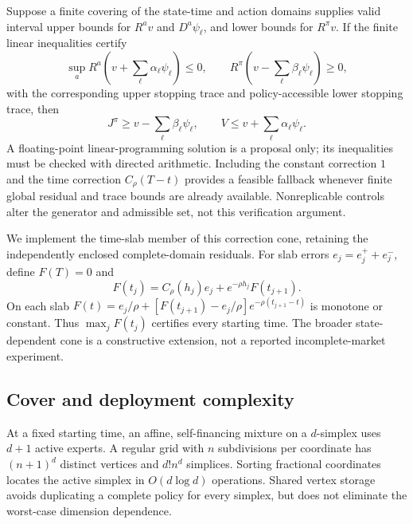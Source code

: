 \begin{proposition}\label{prop:r22cone}
Suppose a finite covering of the state-time and action domains supplies valid interval upper bounds for $R^av$ and $D^a\psi_\ell$, and lower bounds for $R^\pi v$. If the finite linear inequalities certify
\[
 \sup_a R^a\left(v+\sum_\ell\alpha_\ell\psi_\ell\right)\leq0,
 \qquad R^\pi\left(v-\sum_\ell\beta_\ell\psi_\ell\right)\geq0,
\]
with the corresponding upper stopping trace and policy-accessible lower stopping trace, then
\[
 J^\pi\geq v-\sum_\ell\beta_\ell\psi_\ell,
 \qquad V\leq v+\sum_\ell\alpha_\ell\psi_\ell.
\]
A floating-point linear-programming solution is a proposal only; its inequalities must be checked with directed arithmetic. Including the constant correction $1$ and the time correction $C_\rho(T-t)$ provides a feasible fallback whenever finite global residual and trace bounds are already available. Nonreplicable controls alter the generator and admissible set, not this verification argument.
\end{proposition}

We implement the time-slab member of this correction cone, retaining the independently enclosed complete-domain residuals. For slab errors $e_j=e_j^++e_j^-$, define $F(T)=0$ and
\begin{equation}
 F(t_j)=C_\rho(h_j)e_j+e^{-\rho h_j}F(t_{j+1}).\label{eq:r22suffix}
\end{equation}
On each slab $F(t)=e_j/\rho+[F(t_{j+1})-e_j/\rho]e^{-\rho(t_{j+1}-t)}$ is monotone or constant. Thus $\max_jF(t_j)$ certifies every starting time. The broader state-dependent cone is a constructive extension, not a reported incomplete-market experiment.

\subsection{Cover and deployment complexity}\label{sec:r22cover}
At a fixed starting time, an affine, self-financing mixture on a $d$-simplex uses $d+1$ active experts. A regular grid with $n$ subdivisions per coordinate has $(n+1)^d$ distinct vertices and $d!n^d$ simplices. Sorting fractional coordinates locates the active simplex in $O(d\log d)$ operations. Shared vertex storage avoids duplicating a complete policy for every simplex, but does not eliminate the worst-case dimension dependence.


